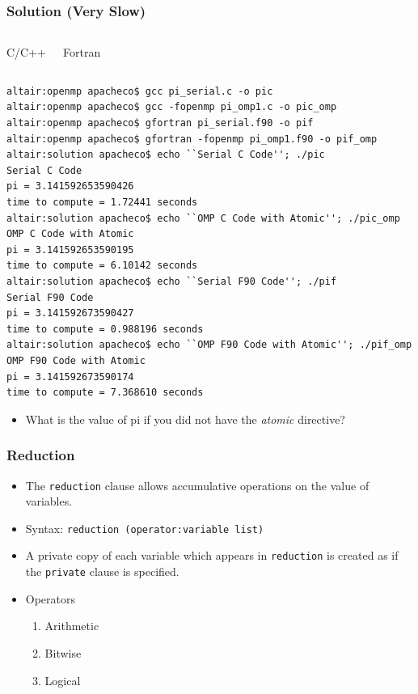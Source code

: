 \documentclass[c,mathserif,compress,xcolor=svgnames]{beamer}
\newenvironment{bblock}[0]
{
\begin{beamerboxesrounded}[upper=uppercol1,lower=lowercol1,shadow=true]}
{\end{beamerboxesrounded}}
\newenvironment{eblock}[0]
{
\begin{beamerboxesrounded}[upper=uppercol2,lower=lowercol2,shadow=true]}
{\end{beamerboxesrounded}}
\begin{document}
\begin{frame}
  \frametitle{\small Solution (Very Slow)}
  \begin{columns}
    \begin{eblock}{C/C++}
      
    \end{eblock}
    \begin{eblock}{Fortran}
      
    \end{eblock}
  \end{columns}
  \begin{bblock}{}
    {\tiny
      \begin{verbatim}
altair:openmp apacheco$ gcc pi_serial.c -o pic
altair:openmp apacheco$ gcc -fopenmp pi_omp1.c -o pic_omp
altair:openmp apacheco$ gfortran pi_serial.f90 -o pif
altair:openmp apacheco$ gfortran -fopenmp pi_omp1.f90 -o pif_omp
altair:solution apacheco$ echo ``Serial C Code''; ./pic
Serial C Code
pi = 3.141592653590426
time to compute = 1.72441 seconds
altair:solution apacheco$ echo ``OMP C Code with Atomic''; ./pic_omp
OMP C Code with Atomic
pi = 3.141592653590195
time to compute = 6.10142 seconds
altair:solution apacheco$ echo ``Serial F90 Code''; ./pif
Serial F90 Code
pi = 3.141592673590427
time to compute = 0.988196 seconds
altair:solution apacheco$ echo ``OMP F90 Code with Atomic''; ./pif_omp
OMP F90 Code with Atomic
pi = 3.141592673590174
time to compute = 7.368610 seconds
      \end{verbatim}
    }
  \end{bblock}
  \begin{itemize}
    \item What is the value of pi if you did not have the \textit{atomic} directive?
  \end{itemize}
\end{frame}

\begin{frame}
  \frametitle{\small Reduction}
  \begin{itemize}
    \item The \texttt{reduction} clause allows accumulative operations on the value of variables.
    \item Syntax: \texttt{reduction (operator:variable list)}
    \item A private copy of each variable which appears in \texttt{reduction} is created as if the \texttt{private} clause is specified.
    \item Operators
    \begin{enumerate}
      \item Arithmetic
      \item Bitwise
      \item Logical
    \end{enumerate}
  \end{itemize}
\end{frame}
\end{document}

